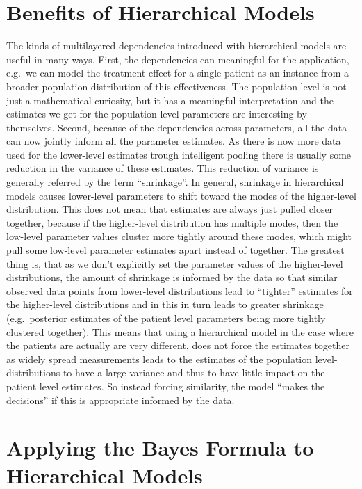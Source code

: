 \documentclass[12pt,a4paper,leqno]{report}
\theoremstyle{plain}
\theoremstyle{definition}
\theoremstyle{remark}
\begin{document}
\section{Benefits of Hierarchical Models}

The kinds of multilayered dependencies introduced with hierarchical models are useful in many ways.
First, the dependencies can meaningful for the application, e.g.\ we can
model the treatment effect for a single patient as an instance from a
broader population distribution of this effectiveness. The population level is not just
a mathematical curiosity, but it has a meaningful interpretation and the estimates we
get for the population-level parameters are interesting by themselves. Second, because
of the dependencies across parameters, all the data can now jointly inform all the
parameter estimates. As there is now more data used for the lower-level estimates trough
intelligent pooling there is usually some reduction in the variance of these estimates.
This reduction of variance is generally referred by the term ``shrinkage''. In general,
shrinkage in hierarchical models causes lower-level parameters to shift toward the modes
of the higher-level distribution. This does not mean that
estimates are always just pulled closer together, because if the higher-level
distribution has multiple modes, then the low-level parameter values cluster
more tightly around these modes, which might pull some
low-level parameter estimates apart instead of together. The greatest thing
is, that as we don't explicitly set the parameter values of the higher-level
distributions, the amount of shrinkage is informed by the data so that
similar observed data points from lower-level distributions lead to ``tighter''
estimates for the higher-level distributions and in this in turn leads to
greater shrinkage (e.g.\ posterior estimates of the patient level parameters being more
tightly clustered together). This means that using a hierarchical model in the case where the
patients are actually are very different, does not force the estimates together as
widely spread measurements leads to the estimates of the population level-distributions to
have a large variance and thus to have little impact on the patient level estimates. So
instead forcing similarity, the model ``makes the decisions'' if this is appropriate informed by the data.

\section{Applying the Bayes Formula to Hierarchical Models}
\end{document}

